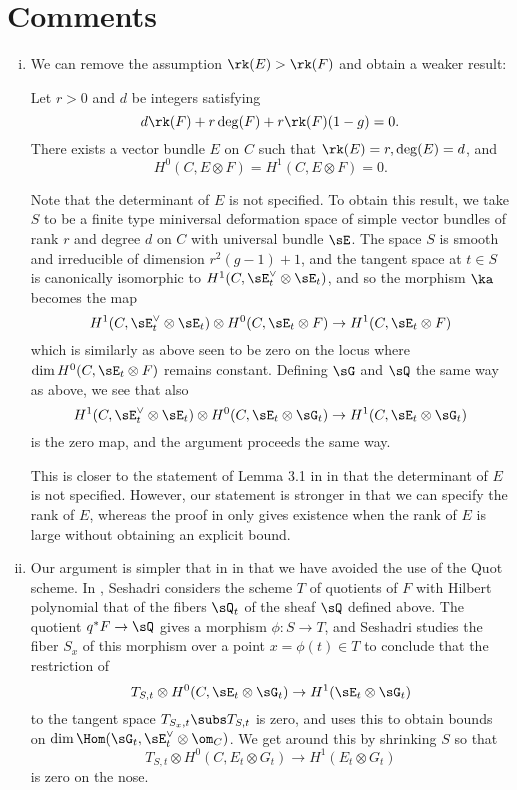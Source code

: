 \section{Comments}
\begin{enumerate}[(i)]
    \item We can remove the assumption $\rk(E) > \rk(F)$ and obtain a weaker result: 
    \begin{thm}
        Let $r > 0$ and $d$ be integers satisfying
        \[ d \rk(F) + r \deg(F) + r \rk(F) (1-g) = 0. \]
        There exists a vector bundle $E$ on $C$ such that $\rk(E) = r, \deg(E) = d$, and 
        \[ H^0(C, E \otimes F) = H^1(C, E \otimes F) = 0. \]
    \end{thm}
    Note that the determinant of $E$ is not specified. To obtain this result, we take $S$ to be a finite type miniversal deformation space of simple vector bundles of rank $r$ and degree $d$ on $C$ with universal bundle $\sE$. The space $S$ is smooth and irreducible of dimension $r^2(g-1)+1$, and the tangent space at $t \in S$ is canonically isomorphic to $H^1(C, \sE_t^\vee \otimes \sE_t)$, and so the morphism $\ka$ becomes the map
    \[ H^1(C, \sE_t^\vee \otimes \sE_t) \otimes H^0(C, \sE_t \otimes F) \to H^1(C, \sE_t \otimes F) \]
    which is similarly as above seen to be zero on the locus where $\dim H^0(C, \sE_t \otimes F)$ remains constant. Defining $\sG$ and $\sQ$ the same way as above, we see that also
    \[ H^1(C, \sE_t^\vee \otimes \sE_t) \otimes H^0(C, \sE_t \otimes \sG_t) \to H^1(C, \sE_t \otimes \sG_t) \]
    is the zero map, and the argument proceeds the same way. 
    
    This is closer to the statement of Lemma 3.1 in \cite{seshadri} in that the determinant of $E$ is not specified. However, our statement is stronger in that we can specify the rank of $E$, whereas the proof in \cite{seshadri} only gives existence when the rank of $E$ is large without obtaining an explicit bound.
 
    \item Our argument is simpler that in \cite{seshadri} in that we have avoided the use of the Quot scheme. In \cite{seshadri}, Seshadri considers the scheme $T$ of quotients of $F$ with Hilbert polynomial that of the fibers $\sQ_t$ of the sheaf $\sQ$ defined above. The quotient $q^*F \to \sQ$ gives a morphism $\phi: S \to T$, and Seshadri studies the fiber $S_x$ of this morphism over a point $x = \phi(t) \in T$ to conclude that the restriction of
    \[ T_{S,t} \otimes H^0(C, \sE_t \otimes \sG_t) \to H^1(\sE_t \otimes \sG_t) \]
    to the tangent space $T_{S_x, t} \subs T_{S,t}$ is zero, and uses this to obtain bounds on $\dim \Hom(\sG_t, \sE_t^\vee \otimes \om_C)$. We get around this by shrinking $S$ so that 
    \[ T_{S,t} \otimes H^0(C, E_t \otimes G_t) \to H^1(E_t \otimes G_t) \]
    is zero on the nose.
    

\end{enumerate}
